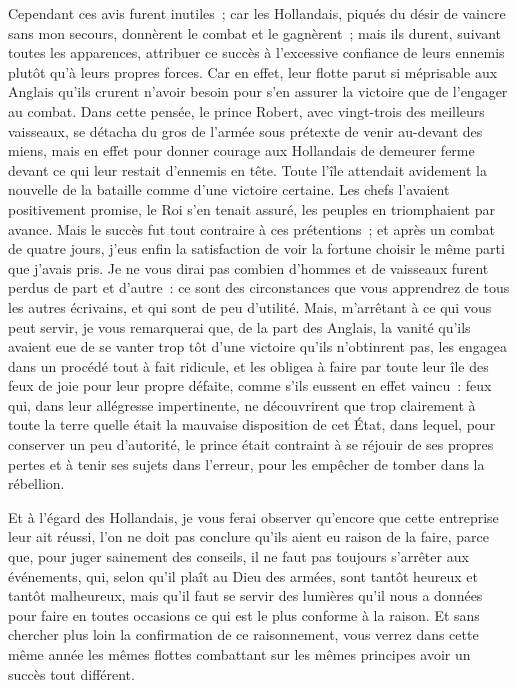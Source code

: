 \documentclass[french,twoside]{book} %
\begin{document}
Cependant ces avis furent inutiles ; car les Hollandais, piqués du désir de vaincre sans mon secours, donnèrent le combat et le gagnèrent ; mais ils durent, suivant toutes les apparences, attribuer ce succès à l’excessive confiance de leurs ennemis plutôt qu’à leurs propres forces. Car en effet, leur flotte parut si méprisable aux Anglais qu’ils crurent n’avoir besoin pour s’en assurer la victoire que de l’engager au combat. Dans cette pensée, le prince Robert, avec vingt-trois des meilleurs vaisseaux, se détacha du gros de l’armée sous prétexte de venir au-devant des miens, mais en effet pour donner courage aux Hollandais de demeurer ferme devant ce qui leur restait d’ennemis en tête. Toute l’île attendait avidement la nouvelle de la bataille comme d’une victoire certaine. Les chefs l’avaient positivement promise, le Roi s’en tenait assuré, les peuples en triomphaient par avance. Mais le succès fut tout contraire à ces prétentions ; et après un combat de quatre jours, j’eus enfin la satisfaction de voir la fortune choisir le même parti que j’avais pris. Je ne vous dirai pas combien d’hommes et de vaisseaux furent perdus de part et d’autre : ce sont des circonstances que vous apprendrez de tous les autres écrivains, et qui sont de peu d’utilité. Mais, m’arrêtant à ce qui vous peut servir, je vous remarquerai que, de la part des Anglais, la vanité qu’ils avaient eue de se vanter trop tôt d’une victoire qu’ils n’obtinrent pas, les engagea dans un procédé tout à fait ridicule, et les obligea à faire par toute leur île des feux de joie pour leur propre défaite, comme s’ils eussent en effet vaincu : feux qui, dans leur allégresse impertinente, ne découvrirent que trop clairement à toute la terre quelle était la mauvaise disposition de cet État, dans lequel, pour conserver un peu d’autorité, le prince était contraint à se réjouir de ses propres pertes et à tenir ses sujets dans l’erreur, pour les empêcher de tomber dans la rébellion.\par
Et à l’égard des Hollandais, je vous ferai observer qu’encore que cette entreprise leur ait réussi, l’on ne doit pas conclure qu’ils aient eu raison de la faire, parce que, pour juger sainement des conseils, il ne faut pas toujours s’arrêter aux événements, qui, selon qu’il plaît au Dieu des armées, sont tantôt heureux et tantôt malheureux, mais qu’il faut se servir des lumières qu’il nous a données pour faire en toutes occasions ce qui est le plus conforme à la raison. Et sans chercher plus loin la confirmation de ce raisonnement, vous verrez dans cette même année les mêmes flottes combattant sur les mêmes principes avoir un succès tout différent.\par
\end{document}
